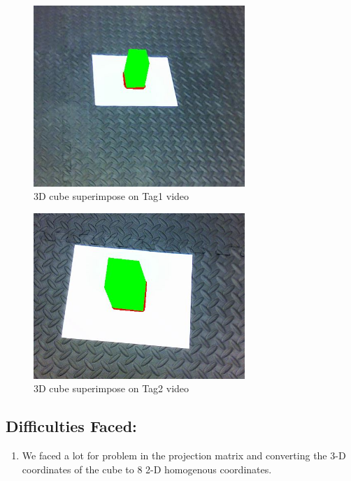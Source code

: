 \documentclass[12pt]{article}
\begin{document}
\begin{figure}[h]
    \centering
    \includegraphics[width=8cm]{Tag1_cube}
    \caption{3D cube superimpose on Tag1 video}
    \label{fig:video frame output}
\end{figure}
\newpage
\begin{figure}[h]
    \centering
    \includegraphics[width=8cm]{Tag2_cube}
    \caption{3D cube superimpose on Tag2 video}
    \label{fig:video frame output}
\end{figure}
\subsection{Difficulties Faced:}
\begin{enumerate}
\item We faced a lot for problem in the projection matrix and converting the 3-D coordinates of the cube to 8 2-D homogenous coordinates.
\end{enumerate}
\end{document}
